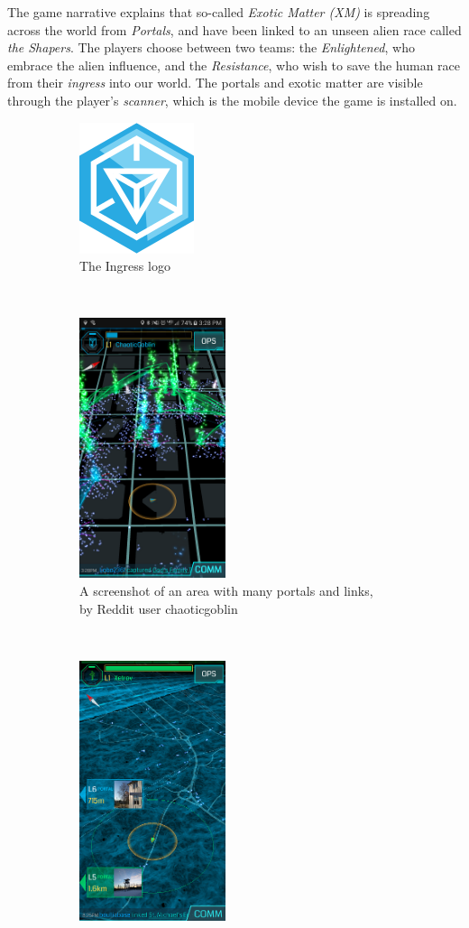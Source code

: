 The game narrative explains that so-called \emph{Exotic Matter (XM)} is spreading across the world from \emph{Portals}, and have been linked to an unseen alien race called \emph{the Shapers}. The players choose between two teams: the \emph{Enlightened}, who embrace the alien influence, and the \emph{Resistance}, who wish to save the human race from their \emph{ingress} into our world. The portals and exotic matter are visible through the player's \emph{scanner}, which is the mobile device the game is installed on.

\begin{figure}[h]
	\centering
	\begin{subfigure}[b]{0.3\textwidth}
		\centering
		\includegraphics{Figures/ingress-logo}
		\caption{The Ingress logo}
	\end{subfigure}
	~
	\begin{subfigure}[t]{0.3\textwidth}
		\centering
		\includegraphics[height=3in]{Figures/chaoticgoblin-ingress-screenshot}
		\caption{A screenshot of an area with many portals and links, by Reddit user chaoticgoblin}
	\end{subfigure}
	~
	\begin{subfigure}[t]{0.3\textwidth}
		\centering
		\includegraphics[height=3in]{Figures/ingress-fielded-area}

\end{subfigure}
\end{figure}
